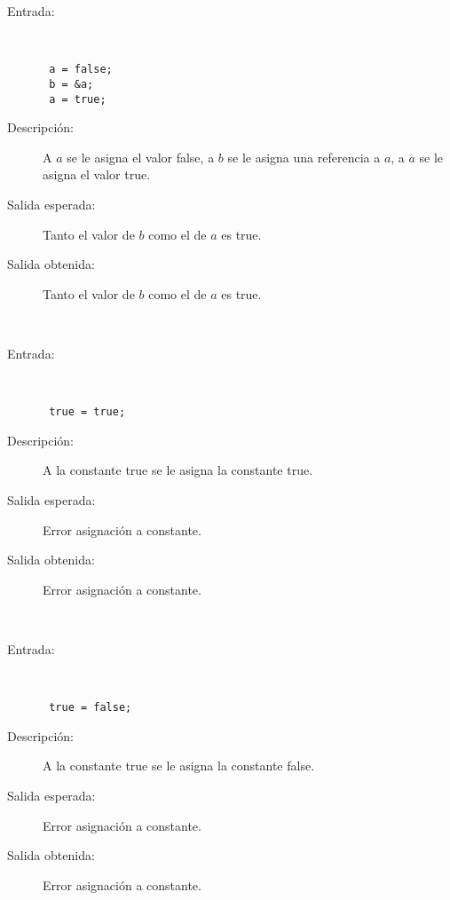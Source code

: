 	\begin{description}
		\item [Entrada:] \hfill \\
\begin{lstlisting}
 a = false; 
 b = &a; 
 a = true; 
\end{lstlisting}
		\item [Descripción:] A $a$ se le asigna el valor false, a $b$ se le asigna una referencia a $a$, a $a$ se le asigna el valor true.
		\item [Salida esperada:] Tanto el valor de $b$ como el de $a$ es true.
		\item [Salida obtenida:] Tanto el valor de $b$ como el de $a$ es true.
	\end{description}
\hfil \\
	\begin{description}
		\item [Entrada:] \hfill \\
\begin{lstlisting}
 true = true;
\end{lstlisting}
		\item [Descripción:] A la constante true se le asigna la constante true.
		\item [Salida esperada:] Error asignación a constante.
		\item [Salida obtenida:] Error asignación a constante.
	\end{description}
\hfil \\
	\begin{description}
		\item [Entrada:] \hfill \\
\begin{lstlisting}
 true = false;
\end{lstlisting}
		\item [Descripción:] A la constante true se le asigna la constante false.
		\item [Salida esperada:] Error asignación a constante.
		\item [Salida obtenida:] Error asignación a constante.
	\end{description}
\hfil \\
